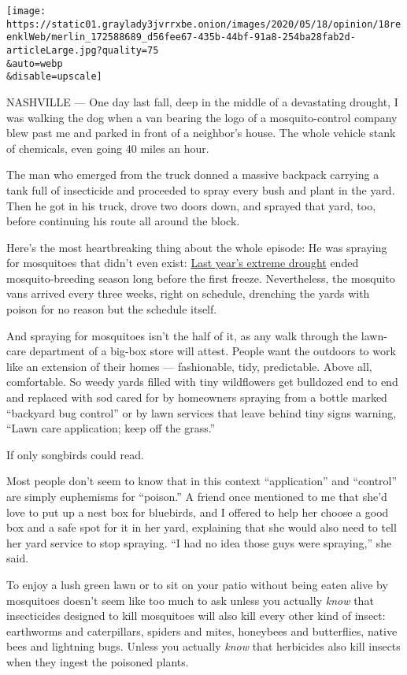 \texttt{[image: https://static01.graylady3jvrrxbe.onion/images/2020/05/18/opinion/18reenklWeb/merlin\_172588689\_d56fee67-435b-44bf-91a8-254ba28fab2d-articleLarge.jpg?quality=75\\\&auto=webp\\\&disable=upscale]}

NASHVILLE --- One day last fall, deep in the middle of a devastating
drought, I was walking the dog when a van bearing the logo of a
mosquito-control company blew past me and parked in front of a
neighbor's house. The whole vehicle stank of chemicals, even going 40
miles an hour.

The man who emerged from the truck donned a massive backpack carrying a
tank full of insecticide and proceeded to spray every bush and plant in
the yard. Then he got in his truck, drove two doors down, and sprayed
that yard, too, before continuing his route all around the block.

Here's the most heartbreaking thing about the whole episode: He was
spraying for mosquitoes that didn't even exist:
\href{https://www.climate.gov/news-features/event-tracker/flash-drought-engulfs-us-southeast-september-2019}{Last
year's extreme drought} ended mosquito-breeding season long before the
first freeze. Nevertheless, the mosquito vans arrived every three weeks,
right on schedule, drenching the yards with poison for no reason but the
schedule itself.

And spraying for mosquitoes isn't the half of it, as any walk through
the lawn-care department of a big-box store will attest. People want the
outdoors to work like an extension of their homes --- fashionable, tidy,
predictable. Above all, comfortable. So weedy yards filled with tiny
wildflowers get bulldozed end to end and replaced with sod cared for by
homeowners spraying from a bottle marked ``backyard bug control'' or by
lawn services that leave behind tiny signs warning, ``Lawn care
application; keep off the grass.''

If only songbirds could read.

Most people don't seem to know that in this context ``application'' and
``control'' are simply euphemisms for ``poison.'' A friend once
mentioned to me that she'd love to put up a nest box for bluebirds, and
I offered to help her choose a good box and a safe spot for it in her
yard, explaining that she would also need to tell her yard service to
stop spraying. ``I had no idea those guys were spraying,'' she said.

To enjoy a lush green lawn or to sit on your patio without being eaten
alive by mosquitoes doesn't seem like too much to ask unless you
actually \emph{know} that insecticides designed to kill mosquitoes will
also kill every other kind of insect: earthworms and caterpillars,
spiders and mites, honeybees and butterflies, native bees and lightning
bugs. Unless you actually \emph{know} that herbicides also kill insects
when they ingest the poisoned plants.

